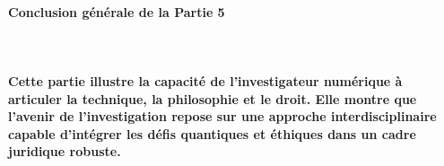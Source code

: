 \documentclass[11pt]{article}
\begin{document}
\paragraph{Conclusion générale de la Partie 5} \\ 
\paragraph*{Cette partie illustre la capacité de l’investigateur numérique à articuler 
la technique, la philosophie et le droit.  
Elle montre que l’avenir de l’investigation repose sur une approche interdisciplinaire 
capable d’intégrer les défis quantiques et éthiques dans un cadre juridique robuste.}
\end{document}
